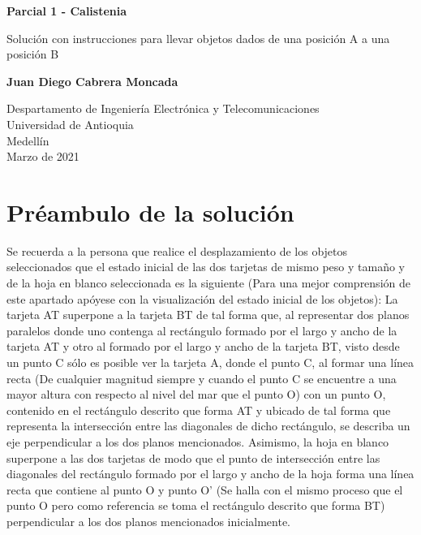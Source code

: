 \documentclass{article}
\begin{document}
\begin{titlepage}
    \begin{center}
        \vspace*{1cm}
            
        \Huge
        \textbf{Parcial 1 - Calistenia}
            
        \vspace{0.5cm}
        \LARGE
        Solución con instrucciones para llevar objetos dados de una posición A a una posición B
            
        \vspace{1.5cm}
            
        \textbf{Juan Diego Cabrera Moncada}
            
        \vfill
            
        \vspace{0.8cm}
            
        \Large
        Despartamento de Ingeniería Electrónica y Telecomunicaciones\\
        Universidad de Antioquia\\
        Medellín\\
        Marzo de 2021
            
    \end{center}
\end{titlepage}

\tableofcontents
\newpage
\section{Préambulo de la solución}\label{intro}
Se recuerda a la persona que realice el desplazamiento de los objetos seleccionados que el estado inicial de las dos tarjetas de mismo peso y tamaño y de la hoja en blanco seleccionada es la siguiente (Para una mejor comprensión de este apartado apóyese con la visualización del estado inicial de los objetos):
La tarjeta AT superpone a la tarjeta BT de tal forma que, al representar dos planos paralelos donde uno contenga al rectángulo formado por el largo y ancho de la tarjeta AT y otro al formado por el largo y ancho de la tarjeta BT, visto desde un punto C sólo es posible ver la tarjeta A, donde el punto C, al formar una línea recta (De cualquier magnitud siempre y cuando el punto C se encuentre a una mayor altura con respecto al nivel del mar que el punto O) con un punto O, contenido en el rectángulo descrito que forma AT y ubicado de tal forma que representa la intersección entre las diagonales de dicho rectángulo, se describa un eje perpendicular a los dos planos mencionados. Asimismo, la hoja en blanco superpone a las dos tarjetas de modo que el punto de intersección entre las diagonales del rectángulo formado por el largo y ancho de la hoja forma una línea recta que contiene al punto O y punto O' (Se halla con el mismo proceso que el punto O pero como referencia se toma el rectángulo descrito que forma BT) perpendicular a los dos planos mencionados inicialmente.
\end{document}

